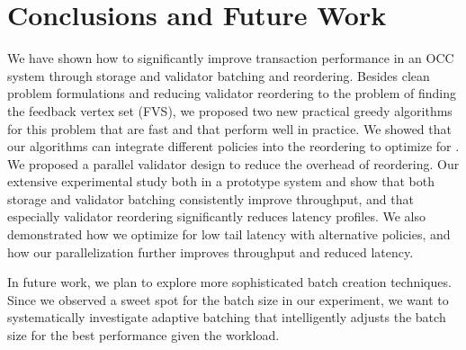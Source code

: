 \section{Conclusions and Future Work}\label{sec:conclusion}

We have shown how to significantly improve transaction performance in an OCC system through storage and validator batching and reordering. Besides clean problem formulations and
reducing validator reordering to the problem of finding the  feedback vertex set (FVS), we proposed two new practical greedy algorithms for this problem
that are fast and that perform well in practice. We showed that our algorithms can integrate different policies into the reordering to optimize for . We  proposed a parallel validator design to reduce the overhead of reordering. Our extensive experimental study both in a prototype system and  show that both storage and validator batching consistently improve throughput, and that especially validator reordering 
significantly reduces latency profiles. We also demonstrated how we optimize for low tail latency with alternative policies, and how our parallelization further improves
throughput and reduced latency.

In future work, we plan to explore more sophisticated batch creation techniques. Since we observed a sweet spot for the  batch size in our experiment, we want to systematically investigate adaptive batching that intelligently adjusts the batch size for the best performance given the workload. 
